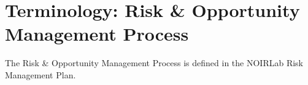 \section{Terminology: Risk \& Opportunity Management Process}
\label{sec:process}

The Risk \& Opportunity Management Process is defined in the NOIRLab Risk Management Plan.








